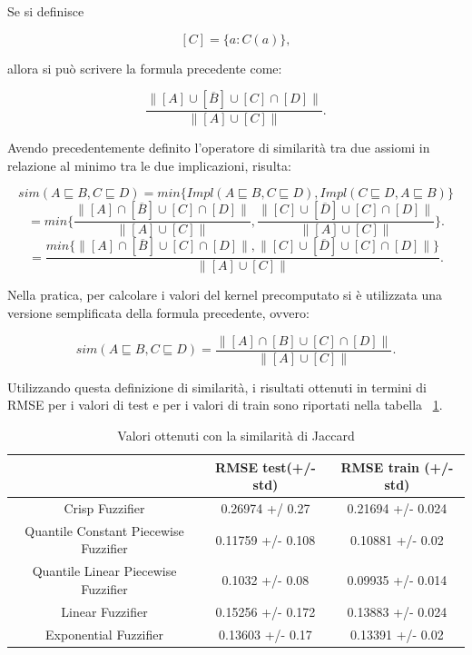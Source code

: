 \documentclass[12pt,a4paper]{report}
\begin{document}
Se si definisce

\[ [C] = \{a : C(a) \},\]

allora si può scrivere la formula precedente come:

\[ \frac{\parallel [A] \cup [\overline{B}] \cup [C] \cap [D] \parallel}{\parallel [A] \cup [C] \parallel}.\]

Avendo precedentemente definito l'operatore di similarità tra due assiomi in relazione al minimo tra le due implicazioni, risulta:

\[ sim(A \sqsubseteq B, C  \sqsubseteq D) = min\{Impl(A \sqsubseteq B, C\sqsubseteq D), Impl( C\sqsubseteq D, A \sqsubseteq B)\} \]
\[ = min\bigg\{\frac{\parallel [A] \cap [\overline{B}] \cup [C] \cap [D] \parallel}{\parallel [A] \cup [C] \parallel}, \frac{\parallel [C] \cup [\overline{D}] \cup [C] \cap [D] \parallel}{\parallel [A] \cup [C] \parallel}\bigg\}.\]
\[ = \frac{min\{\parallel [A] \cap [\overline{B}] \cup [C] \cap [D] \parallel, \parallel [C] \cup [\overline{D}] \cup [C] \cap [D] \parallel\}}{\parallel [A] \cup [C] \parallel}.\]

Nella pratica, per calcolare i valori del kernel precomputato si è utilizzata una versione semplificata della formula precedente, ovvero:

\[sim(A \sqsubseteq B, C  \sqsubseteq D) = \frac{\parallel [A] \cap [B] \cup [C] \cap [D] \parallel}{\parallel [A] \cup [C] \parallel}. \]

Utilizzando questa definizione di similarità, i risultati ottenuti in termini di RMSE per i valori di test e per i valori di train sono riportati nella tabella ~\ref{table:risultatiJaccard}.

\begin{table}
\small
\centering 	
	\begin{tabular}{|c|c|c|}
	 \hline
	  & RMSE test(+/- std) & RMSE train (+/- std)\\ [0.5ex] 
	 \hline
	 Crisp Fuzzifier & 0.26974 +/ 0.27 & 0.21694 +/- 0.024 \\ 
	 \hline
	 Quantile Constant Piecewise Fuzzifier & 0.11759 +/- 0.108 & 0.10881 +/- 0.02\\
	 \hline
	 Quantile Linear Piecewise Fuzzifier & 0.1032 +/- 0.08 & 0.09935 +/- 0.014\\
	 \hline
	 Linear Fuzzifier & 0.15256 +/- 0.172 & 0.13883 +/- 0.024\\
	 \hline
	 Exponential Fuzzifier & 0.13603 +/- 0.17 & 0.13391 +/- 0.02\\ [1ex] 
	 \hline
	\end{tabular}
\caption{Valori ottenuti con la similarità di Jaccard}
\label{table:risultatiJaccard}
\end{table}
\end{document}

